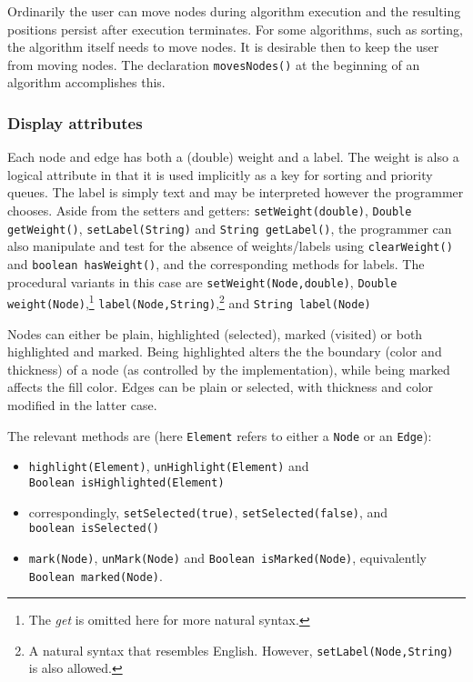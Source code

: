 Ordinarily the user can move nodes during algorithm execution
and the resulting positions persist after execution terminates.
For some algorithms, such as sorting, the algorithm itself needs to move
nodes.
It is desirable then to keep the user from moving nodes.
The declaration \texttt{movesNodes()} at the beginning of an algorithm
accomplishes this.

\subsubsection{Display attributes} \label{sec:display_attributes}

Each node and edge has
both a (double) weight and a label.
The weight
is also a logical
attribute in that
it is used implicitly as a
key for
sorting and priority queues.
The label is simply text and may be interpreted however the programmer
chooses.
Aside from the setters and getters: \texttt{setWeight(double)},
\mbox{\texttt{Double getWeight()}}, \texttt{setLabel(String)}
and \mbox{\texttt{String getLabel()}}, the programmer can also
manipulate and test for the absence of weights/labels using
\texttt{clearWeight()} and \texttt{boolean~hasWeight()},
and the corresponding methods for labels.
The procedural variants in this case are
\texttt{setWeight(Node,double)},
\mbox{\texttt{Double weight(Node)}},\footnote{
  The \emph{get} is omitted here for more natural syntax.}
\texttt{label(Node,String)},\footnote{
  A natural syntax that resembles English. However,
  \texttt{setLabel(Node,String)} is also allowed.
}
and \mbox{\texttt{String label(Node)}}

Nodes can either be plain, highlighted (selected), marked (visited) or both highlighted and
marked.
Being highlighted alters the
the boundary (color and thickness) of a node (as controlled by the
implementation), while being marked affects the fill color.
Edges can be plain or selected, with thickness and color modified in the
latter case.

The relevant methods are
(here \texttt{Element} refers to either a \texttt{Node} or an \texttt{Edge}):
\begin{itemize}
\item \texttt{highlight(Element)}, \texttt{unHighlight(Element)}
  and \texttt{Boolean~isHighlighted(Element)}
\item correspondingly, \texttt{setSelected(true)}, \texttt{setSelected(false)},
and \texttt{boolean~isSelected()}
\item \texttt{mark(Node)}, \texttt{unMark(Node)}
  and \texttt{Boolean~isMarked(Node)},
  equivalently \texttt{Boolean~marked(Node)}.
\end{itemize}

